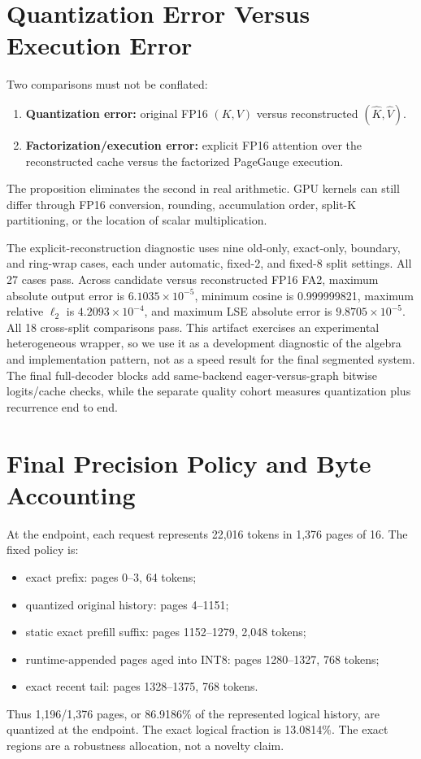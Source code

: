 \section{Quantization Error Versus Execution Error}

Two comparisons must not be conflated:
\begin{enumerate}
\item \textbf{Quantization error:} original FP16 $(K,V)$ versus reconstructed
$(\widehat K,\widehat V)$.
\item \textbf{Factorization/execution error:} explicit FP16 attention over the
reconstructed cache versus the factorized PageGauge execution.
\end{enumerate}
The proposition eliminates the second in real arithmetic. GPU kernels can
still differ through FP16 conversion, rounding, accumulation order, split-K
partitioning, or the location of scalar multiplication.

The explicit-reconstruction diagnostic uses nine old-only, exact-only,
boundary, and ring-wrap cases, each under automatic, fixed-2, and fixed-8 split
settings. All 27 cases pass. Across candidate versus reconstructed FP16 FA2,
maximum absolute output error is $6.1035\times10^{-5}$, minimum cosine is
0.999999821, maximum relative $\ell_2$ is $4.2093\times10^{-4}$, and maximum LSE
absolute error is $9.8705\times10^{-5}$. All 18 cross-split comparisons pass.
This artifact exercises an experimental heterogeneous wrapper, so we use it as
a development diagnostic of the algebra and implementation pattern, not as a
speed result for the final segmented system. The final full-decoder blocks add
same-backend eager-versus-graph bitwise logits/cache checks, while the separate
quality cohort measures quantization plus recurrence end to end.

\section{Final Precision Policy and Byte Accounting}

At the endpoint, each request represents 22,016 tokens in 1,376 pages of 16.
The fixed policy is:
\begin{itemize}
\item exact prefix: pages 0--3, 64 tokens;
\item quantized original history: pages 4--1151;
\item static exact prefill suffix: pages 1152--1279, 2,048 tokens;
\item runtime-appended pages aged into INT8: pages 1280--1327, 768 tokens;
\item exact recent tail: pages 1328--1375, 768 tokens.
\end{itemize}
Thus 1,196/1,376 pages, or 86.9186\% of the represented logical history, are
quantized at the endpoint. The exact logical fraction is 13.0814\%. The exact
regions are a robustness allocation, not a novelty claim.

